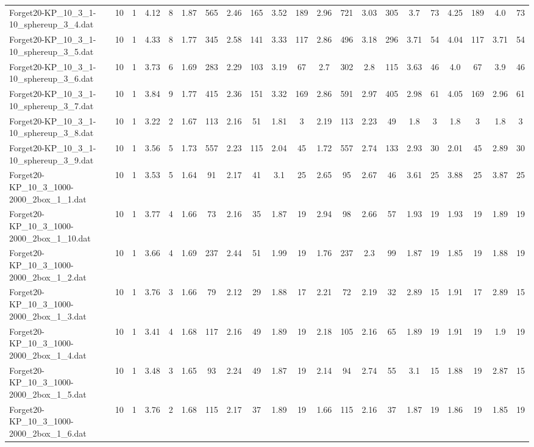 \begin{sidewaystable}[!ht]
{\begin{tabular}{lcccccccccccccccccccc}
Forget20-KP\_10\_3\_1-10\_sphereup\_3\_4.dat & 10 & 1 & 4.12 & 8 & 1.87 & 565 & 2.46 & 165 & 3.52 & 189 & 2.96 & 721 & 3.03 & 305 & 3.7 & 73 & 4.25 & 189 & 4.0 & 73 \\
Forget20-KP\_10\_3\_1-10\_sphereup\_3\_5.dat & 10 & 1 & 4.33 & 8 & 1.77 & 345 & 2.58 & 141 & 3.33 & 117 & 2.86 & 496 & 3.18 & 296 & 3.71 & 54 & 4.04 & 117 & 3.71 & 54 \\
Forget20-KP\_10\_3\_1-10\_sphereup\_3\_6.dat & 10 & 1 & 3.73 & 6 & 1.69 & 283 & 2.29 & 103 & 3.19 & 67 & 2.7 & 302 & 2.8 & 115 & 3.63 & 46 & 4.0 & 67 & 3.9 & 46 \\
Forget20-KP\_10\_3\_1-10\_sphereup\_3\_7.dat & 10 & 1 & 3.84 & 9 & 1.77 & 415 & 2.36 & 151 & 3.32 & 169 & 2.86 & 591 & 2.97 & 405 & 2.98 & 61 & 4.05 & 169 & 2.96 & 61 \\
Forget20-KP\_10\_3\_1-10\_sphereup\_3\_8.dat & 10 & 1 & 3.22 & 2 & 1.67 & 113 & 2.16 & 51 & 1.81 & 3 & 2.19 & 113 & 2.23 & 49 & 1.8 & 3 & 1.8 & 3 & 1.8 & 3 \\
Forget20-KP\_10\_3\_1-10\_sphereup\_3\_9.dat & 10 & 1 & 3.56 & 5 & 1.73 & 557 & 2.23 & 115 & 2.04 & 45 & 1.72 & 557 & 2.74 & 133 & 2.93 & 30 & 2.01 & 45 & 2.89 & 30 \\
Forget20-KP\_10\_3\_1000-2000\_2box\_1\_1.dat & 10 & 1 & 3.53 & 5 & 1.64 & 91 & 2.17 & 41 & 3.1 & 25 & 2.65 & 95 & 2.67 & 46 & 3.61 & 25 & 3.88 & 25 & 3.87 & 25 \\
Forget20-KP\_10\_3\_1000-2000\_2box\_1\_10.dat & 10 & 1 & 3.77 & 4 & 1.66 & 73 & 2.16 & 35 & 1.87 & 19 & 2.94 & 98 & 2.66 & 57 & 1.93 & 19 & 1.93 & 19 & 1.89 & 19 \\
Forget20-KP\_10\_3\_1000-2000\_2box\_1\_2.dat & 10 & 1 & 3.66 & 4 & 1.69 & 237 & 2.44 & 51 & 1.99 & 19 & 1.76 & 237 & 2.3 & 99 & 1.87 & 19 & 1.85 & 19 & 1.88 & 19 \\
Forget20-KP\_10\_3\_1000-2000\_2box\_1\_3.dat & 10 & 1 & 3.76 & 3 & 1.66 & 79 & 2.12 & 29 & 1.88 & 17 & 2.21 & 72 & 2.19 & 32 & 2.89 & 15 & 1.91 & 17 & 2.89 & 15 \\
Forget20-KP\_10\_3\_1000-2000\_2box\_1\_4.dat & 10 & 1 & 3.41 & 4 & 1.68 & 117 & 2.16 & 49 & 1.89 & 19 & 2.18 & 105 & 2.16 & 65 & 1.89 & 19 & 1.91 & 19 & 1.9 & 19 \\
Forget20-KP\_10\_3\_1000-2000\_2box\_1\_5.dat & 10 & 1 & 3.48 & 3 & 1.65 & 93 & 2.24 & 49 & 1.87 & 19 & 2.14 & 94 & 2.74 & 55 & 3.1 & 15 & 1.88 & 19 & 2.87 & 15 \\
Forget20-KP\_10\_3\_1000-2000\_2box\_1\_6.dat & 10 & 1 & 3.76 & 2 & 1.68 & 115 & 2.17 & 37 & 1.89 & 19 & 1.66 & 115 & 2.16 & 37 & 1.87 & 19 & 1.86 & 19 & 1.85 & 19 \\

\end{tabular}}
\end{sidewaystable}
